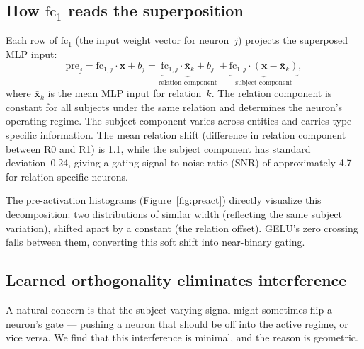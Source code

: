 \documentclass[11pt,a4paper]{article}
\newcommand{\bx}{\mathbf{x}}
\newcommand{\fc}{\mathrm{fc}}
\begin{document}
\subsection{How $\fc_1$ reads the superposition}
\label{sec:fc1_reads}

Each row of $\fc_1$ (the input weight vector for neuron~$j$) projects
the superposed MLP input:
\begin{equation}
\mathrm{pre}_j = \fc_{1,j} \cdot \bx + b_j
  = \underbrace{\fc_{1,j} \cdot \bar{\bx}_k + b_j}_{\text{relation component}}
  + \underbrace{\fc_{1,j} \cdot (\bx - \bar{\bx}_k)}_{\text{subject component}},
\label{eq:pre_decomp}
\end{equation}
where $\bar{\bx}_k$ is the mean MLP input for relation~$k$. The
relation component is constant for all subjects under the same
relation and determines the neuron's operating regime. The subject
component varies across entities and carries type-specific
information. The mean relation shift (difference in relation component
between R0 and R1) is 1.1, while the subject component has standard
deviation~0.24, giving a gating signal-to-noise ratio (SNR) of
approximately 4.7 for relation-specific neurons.

The pre-activation histograms (Figure~\ref{fig:preact}) directly
visualize this decomposition: two distributions of similar width
(reflecting the same subject variation), shifted apart by a constant
(the relation offset). GELU's zero crossing falls between them,
converting this soft shift into near-binary gating.

\subsection{Learned orthogonality eliminates interference}
\label{sec:orthogonality}

A natural concern is that the subject-varying signal might sometimes
flip a neuron's gate --- pushing a neuron that should be off into the
active regime, or vice versa. We find that this interference is
minimal, and the reason is geometric.
\end{document}
